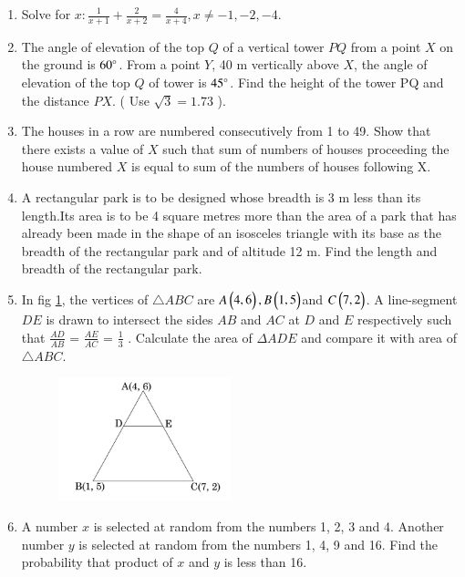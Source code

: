 \documentclass[book,11pt]{IEEEtran}
\renewcommand\thesection{\arabic{section}}
\begin{document}
\begin{enumerate}[label=\thesection.\arabic*.,ref=\thesection.\theenumi]
\item  Solve for $ x :  \frac{1}{x+1}  + \frac{2}{x+2}  = \frac{4}{x+4} , x \neq -1,-2,-4 .$ \\

\item The angle of elevation of the top $Q$ of a vertical tower $PQ$ from a point $X$ on the ground is $ 60\degree $. From a point $Y$, 40 m vertically above $X$, the angle of elevation of the top $Q$ of tower is $ 45 \degree $. Find the height of the tower PQ and the distance $PX$. ( Use $ \sqrt{3} = 1.73 $ ).\\
 
\item The houses in a row are numbered consecutively from 1 to 49. Show that there exists a value of $X$ such that sum of numbers of houses proceeding the house numbered $X$ is equal to sum of the numbers of houses following X.\\

\item A rectangular park is to be designed whose breadth is 3 m less than its length.Its area is to be 4 square metres more than the area of a park that has already been made in the shape of an isosceles triangle with its base as the breadth of the rectangular park and of altitude 12 m. Find the length and breadth of the rectangular park.\\

\item In fig \ref{figure_8}, the vertices of $\triangle ABC$ are $A\begin{pmatrix}4, 6\end{pmatrix}, B\begin{pmatrix}1, 5\end{pmatrix}$and $C\begin{pmatrix}7, 2\end{pmatrix}$. A line-segment $DE$ is drawn to intersect the sides $AB$ and $AC$ at $D$ and $E$ respectively such that $\frac{AD}{AB}$ = $\frac{AE}{AC}$ = $\frac{1}{3}$ . Calculate the area of \( \Delta ADE \) and compare it with area of $ \triangle ABC$.\\
	\begin{figure}[h!]
      \centering
      \includegraphics[width=5cm]{figs/8.png}
     \caption{}
      \label{figure_8}
\end{figure} 

\item A number $x$ is selected at random from the numbers 1, 2, 3 and 4. Another number $y$ is selected at random from the numbers 1, 4, 9 and 16. Find the probability that product of $x$ and $y$ is less than 16.\\


\end{enumerate}
\end{document}
